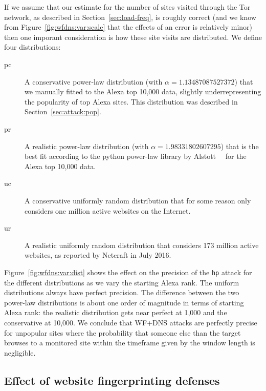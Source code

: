 If we assume that our estimate for the number of sites visited through the Tor
network, as described in Section~\ref{sec:load-freq}, is roughly correct
(and we know from Figure~\ref{fig:wfdns:var:scale} that the effects of an error
is relatively minor) then one imporant consideration is how
these site visits are distributed. We define four distributions:
\begin{description}
	\item[pc] A conservative power-law distribution
	(with $\alpha=1.13487087527372$)
	that we manually fitted to the Alexa top 10,000 data,
	slightly underrepresenting the popularity of top Alexa sites.
	This distribution was described in Section~\ref{sec:attack:pop}.
	\item[pr] A realistic power-law distribution
	(with $\alpha=1.98331802607295$)
	that is the best fit according to
	the python power-law library by Alstott~\ea~\cite{power-law} for the Alexa
	top 10,000 data.
	\item[uc] A conservative uniformly random distribution that for some reason
	only considers one million active websites on the Internet.
	\item[ur] A realistic uniformly random distribution that considers 173 million active websites, as reported by Netcraft in July 2016.
\end{description}
Figure~\ref{fig:wfdns:var:dist} shows the effect on the precision of the
\texttt{hp} attack for the different distributions as we vary the starting
Alexa rank. The uniform distributions always have perfect precision.
The difference between the two power-law distributions is about one order of
magnitude in terms of starting Alexa rank: the realistic distribution gets
near perfect at 1,000 and the conservative at 10,000.
We conclude that WF+DNS attacks are perfectly precise for unpopular sites
where the probability that someone else than the target browses to a monitored
site within the timeframe given by the window length is negligible.


\subsection{Effect of website fingerprinting defenses}

